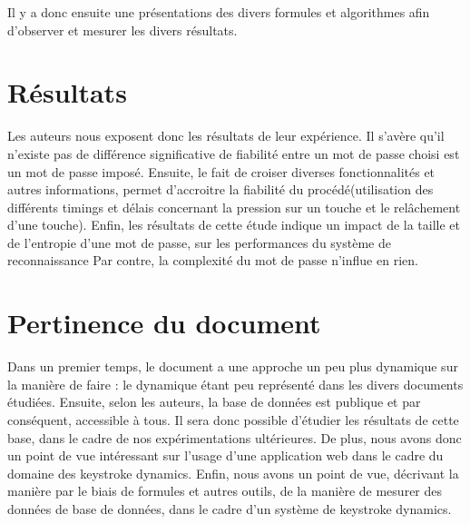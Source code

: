\documentclass[a4paper,11pt]{article}
\begin{document}
Il y a donc ensuite une présentations des divers formules et algorithmes afin d'observer et mesurer les divers résultats.

\section{Résultats}

	Les auteurs nous exposent donc les résultats de leur expérience. 
Il s'avère qu'il n'existe pas de différence significative de fiabilité entre un mot de passe choisi est un mot de passe imposé.
Ensuite, le fait de croiser diverses fonctionnalités et autres informations, permet d'accroitre la fiabilité du procédé(utilisation des différents timings et délais concernant la pression sur un touche et le relâchement d'une touche).
Enfin, les résultats de cette étude indique un impact de la taille et de l'entropie d'une mot de passe, sur les performances du système de reconnaissance Par contre, la complexité du mot de passe n'influe en rien.


\section{Pertinence du document}

	Dans un premier temps, le document a une approche un peu plus dynamique sur la manière de faire : le dynamique étant peu représenté dans les divers documents étudiées. Ensuite, selon les auteurs, la base de données est publique et par conséquent, accessible à tous. Il sera donc possible d'étudier les résultats de cette base, dans le cadre de nos expérimentations ultérieures. De plus, nous avons donc un point de vue intéressant sur l'usage d'une application web dans le cadre du domaine des keystroke dynamics. Enfin, nous avons un point de vue, décrivant la manière par le biais de formules et autres outils, de la manière de mesurer des données de base de données, dans le cadre d'un système de keystroke dynamics.
\end{document}

